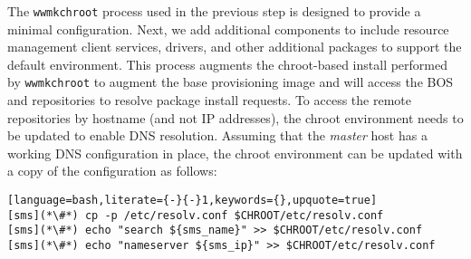 The \texttt{wwmkchroot} process used in the previous step is designed to
provide a minimal \baseOS{} configuration. Next, we add additional components
to include resource management client services, \InfiniBand{} drivers, and
other additional packages to support the default \OHPC{} environment. This
process augments the chroot-based install performed by \texttt{wwmkchroot} to
augment the base provisioning image and will access the BOS and \OHPC{}
repositories to resolve package install requests. To access the remote
repositories by hostname (and not IP addresses), the chroot environment needs
to be updated to enable DNS resolution. Assuming that the {\em master} host has
a working DNS configuration in place, the chroot environment can be updated
with a copy of the configuration as follows:

\begin{lstlisting}[language=bash,literate={-}{-}1,keywords={},upquote=true]
[sms](*\#*) cp -p /etc/resolv.conf $CHROOT/etc/resolv.conf
[sms](*\#*) echo "search ${sms_name}" >> $CHROOT/etc/resolv.conf
[sms](*\#*) echo "nameserver ${sms_ip}" >> $CHROOT/etc/resolv.conf
\end{lstlisting}
